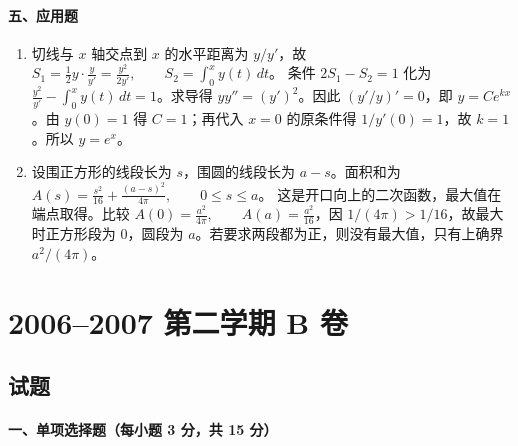 \paragraph*{五、应用题}
\begin{enumerate}
  \item 切线与 $x$ 轴交点到 $x$ 的水平距离为 $y/y'$，故
  \(\displaystyle S_1=\frac12y\cdot\frac{y}{y'}=\frac{y^2}{2y'},\qquad
  S_2=\int_0^x y(t)\,dt\)。
  条件 $2S_1-S_2=1$ 化为
  \(\displaystyle \frac{y^2}{y'}-\int_0^xy(t)\,dt=1\)。求导得 \(\displaystyle yy''=(y')^2\)。因此 $(y'/y)'=0$，即 $y=Ce^{kx}$。由 $y(0)=1$ 得 $C=1$；再代入 $x=0$ 的原条件得 $1/y'(0)=1$，故 $k=1$。所以
  \(\displaystyle y=e^x\)。
  \item 设围正方形的线段长为 $s$，围圆的线段长为 $a-s$。面积和为
  \(\displaystyle A(s)=\frac{s^2}{16}+\frac{(a-s)^2}{4\pi},\qquad 0\le s\le a\)。
  这是开口向上的二次函数，最大值在端点取得。比较
  \(\displaystyle A(0)=\frac{a^2}{4\pi},\qquad A(a)=\frac{a^2}{16}\)，因 $1/(4\pi)>1/16$，故最大时正方形段为 $0$，圆段为 $a$。若要求两段都为正，则没有最大值，只有上确界 $a^2/(4\pi)$。
\end{enumerate}

\section{2006--2007 第二学期 B 卷}

\subsection{试题}

\paragraph*{一、单项选择题（每小题 3 分，共 15 分）}

